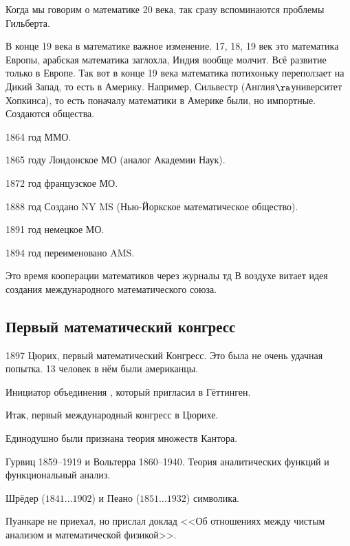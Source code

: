 \documentclass[a4paper,oneside,fleqn,10pt]{article}
\newcommand{\pe}[2]{${#1}\ldots{#2}$}
\begin{document}
Когда мы говорим о математике 20 века, так сразу вспоминаются проблемы
Гильберта.

В конце 19 века в математике важное изменение. 17, 18, 19 век это
математика Европы, арабская математика заглохла, Индия вообще
молчит. Всё развитие только в Европе.  Так вот в конце 19 века
математика потихоньку переползает на Дикий Запад, то есть в Америку.
Например, Сильвестр (Англия$\ra$университет Хопкинса), то есть
поначалу математики в Америке были, но импортные. Создаются общества.

\begin{items}{-2}
\item 1864 год ММО.
\item 1865 году Лондонское МО (аналог Академии Наук).
\item 1872 год французское МО.
\item 1888 год Создано NY MS (Нью-Йоркское математическое общество).
\item 1891 год немецкое МО.
\item 1894 год переименовано AMS.
\end{items}

Это время кооперации математиков через журналы тд В воздухе витает
идея создания международного математического союза.

\subsection{Первый математический конгресс}

1897 Цюрих, первый математический Конгресс. Это была не очень удачная
попытка.  13 человек в нём были американцы.

Инициатор объединения , который
пригласил  в Гёттинген.

Итак, первый международный конгресс в Цюрихе.

\begin{items}{-2}
\item Единодушно были признана теория множеств Кантора.
\item Гурвиц 1859--1919 и Вольтерра 1860--1940. Теория аналитических
  функций и функциональный анализ.
\item Шрёдер (\pe{1841}{1902}) и Пеано (\pe{1851}{1932}) символика.
\item Пуанкаре не приехал, но прислал доклад <<Об отношениях между
  чистым анализом и математической физикой>>.
\end{items}
\end{document}
